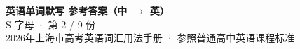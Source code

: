 \documentclass[10pt,a4paper]{article}
\begin{document}
\pagestyle{plain}

\begin{center}
{\LARGE\bfseries 英语单词默写 \quad 参考答案（中 $\to$ 英）}\\[0.22em]
{\large S 字母 · 第 2 / 9 份}\\[0.18em]
{\small 2026年上海市高考英语词汇用法手册 · 参照普通高中英语课程标准}
\end{center}

\vspace{0.2em}
\noindent{\color{rulegray}\rule{\textwidth}{0.8pt}}

\vspace{0.35em}

\vspace{0.25em}
\renewcommand{\arraystretch}{1.32}
\end{document}
